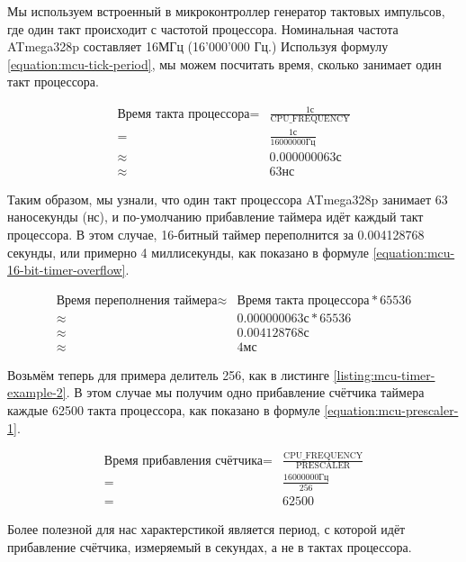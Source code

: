 \documentclass[../sparc.tex]{subfiles}
\begin{document}
Мы используем встроенный в микроконтроллер генератор тактовых импульсов, где
один такт происходит с частотой процессора.  Номинальная частота ATmega328p
составляет 16МГц (16'000'000 Гц.)  Используя формулу
\ref{equation:mcu-tick-period}, мы можем посчитать время, сколько занимает один
такт процессора.

\begin{align}
  \mbox{Время такта процессора} =& \frac{1\mbox{с}}{\mbox{CPU\_FREQUENCY}} \nonumber \\
  =& \frac{1\mbox{с}}{16000000 \mbox{Гц}} \nonumber \\
  \approx& 0.000000063\mbox{с} \\
  \approx& 63\mbox{нс}
  \label{equation:mcu-tick-period}
\end{align}

Таким образом, мы узнали, что один такт процессора ATmega328p занимает 63
наносекунды (нс), и по-умолчанию прибавление таймера идёт каждый такт
процессора.  В этом случае, 16-битный таймер переполнится за 0.004128768
секунды, или примерно 4 миллисекунды, как показано в формуле
\ref{equation:mcu-16-bit-timer-overflow}.

\begin{align}
  \mbox{Время переполнения таймера} \approx& \mbox{Время такта процессора} * 65536 \nonumber \\
  \approx& 0.000000063\mbox{с} * 65536 \nonumber \\
  \approx& 0.004128768\mbox{с} \\
  \approx& 4\mbox{мс}
  \label{equation:mcu-16-bit-timer-overflow}
\end{align}

Возьмём теперь для примера делитель 256, как в листинге
\ref{listing:mcu-timer-example-2}.  В этом случае мы получим одно прибавление
счётчика таймера каждые 62500 такта процессора, как показано в формуле
\ref{equation:mcu-prescaler-1}.

\begin{align}
  \mbox{Время прибавления счётчика} =& \frac{\mbox{CPU\_FREQUENCY}}{\mbox{PRESCALER}} \nonumber \\
  =& \frac{16000000 \mbox{Гц}}{256} \nonumber \\
  =& 62500
  \label{equation:mcu-prescaler-1}
\end{align}

Более полезной для нас характерстикой является период, с которой идёт
прибавление счётчика, измеряемый в секундах, а не в тактах процессора.
\end{document}
